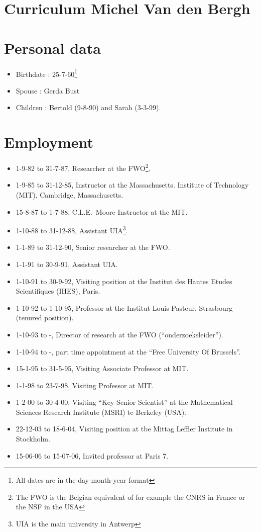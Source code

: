 \documentclass{amsart}
\begin{document}
\section*{Curriculum Michel Van den Bergh}
\section*{Personal data} \begin{itemize}
\item
Birthdate : 25-7-60\footnote{All dates are in the day-month-year
format}
\item
Spouse : Gerda Bust
\item
Children : Bertold (9-8-90) and Sarah (3-3-99).
\end{itemize}
\section*{Employment}
\begin{itemize}
\item
1-9-82 to 31-7-87, Researcher at the FWO\footnote{The FWO is the Belgian
equivalent of for example the CNRS in France or the NSF in the USA}.
\item
1-9-85 to 31-12-85, Instructor at the Massachusetts.
Institute of Technology (MIT), Cambridge, Massachusetts.
\item
15-8-87 to 1-7-88, C.L.E.~Moore Instructor at the MIT.
\item
1-10-88 to 31-12-88, Assistant UIA\footnote{UIA is the main university in
Antwerp}.
\item
1-1-89 to 31-12-90, Senior researcher at the FWO.
\item
1-1-91 to 30-9-91, Assistant UIA.
\item
1-10-91 to 30-9-92, Visiting position at the Institut des Hautes Etudes
Scientifiques (IHES), Paris.
\item
1-10-92 to 1-10-95, Professor at the Institut Louis Pasteur,
Strasbourg (tenured position).
\item
1-10-93 to -, Director of research at the FWO
(``onderzoeksleider''). 
\item
1-10-94 to -, part time appointment at the ``Free University Of Brussels''.
\item
15-1-95 to 31-5-95, Visiting Associate Professor at MIT.
\item
1-1-98 to 23-7-98, Visiting Professor at MIT.
\item
1-2-00 to 30-4-00, Visiting ``Key Senior Scientist'' at the
Mathematical Sciences Research Institute (MSRI) te Berkeley (USA). 
\item 
22-12-03 to 18-6-04, Visiting position at tbe Mittag Leffler Institute in
Stockholm.
\item
15-06-06 to 15-07-06, Invited professor at Paris 7. 
\end{itemize}
\end{document}
